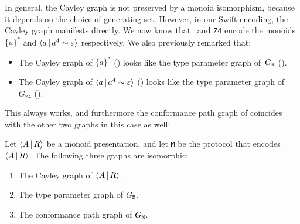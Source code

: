 \documentclass[../generics]{subfiles}
\begin{document}
In general, the Cayley graph is not preserved by a monoid isomorphism, because it depends on the choice of generating set. However, in our Swift encoding, the Cayley graph manifests directly. We now know that \tN\ and \texttt{Z4} encode the monoids $\{a\}^*$ and $\langle a\,|\,a^4\sim\varepsilon\rangle$ respectively. We also previously remarked that:
\begin{itemize}
\item The Cayley graph of $\{a\}^*$ () looks like the type parameter graph of~$G_{\texttt{N}}$ ().
\item The Cayley graph of $\langle a\,|\,a^4\sim\varepsilon\rangle$ () looks like the type parameter graph of~$G_\texttt{Z4}$ ().
\end{itemize}
This always works, and furthermore the conformance path graph of  coincides with the other two graphs in this case as well:
\begin{theorem}
Let $\langle A\,|\,R\rangle$ be a monoid presentation, and let \texttt{M} be the protocol that encodes $\langle A\,|\,R\rangle$. The following three graphs are isomorphic:
\begin{enumerate}
\item The Cayley graph of $\langle A\,|\,R\rangle$.
\item The type parameter graph of $G_\texttt{M}$.
\item The conformance path graph of $G_\texttt{M}$.
\end{enumerate}
\end{theorem}
\end{document}
